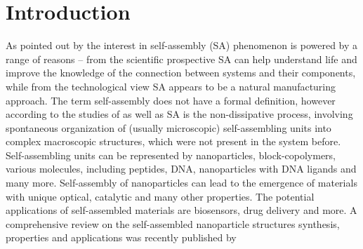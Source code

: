 \section{Introduction}

As pointed out by %
\citet{sadef} the interest in self-assembly (SA) phenomenon is powered by a range of reasons -- from the scientific prospective SA can help understand life and improve the knowledge of the connection between systems and their components, while from the technological view SA appears to be a natural manufacturing approach. The term self-assembly does not have a formal definition,\cite{sadef} however according to the studies of %
\citet{saterm1} as well as %
\citet{saterm2} SA is the non-dissipative process, involving spontaneous organization of  (usually microscopic) self-assembling units  into complex macroscopic structures, which were not present in the system before. 
Self-assembling units can be represented by nanoparticles,\cite{nanopartunit,nanpartun1} block-copolymers,\cite{blockcpunit} various molecules, including peptides,\cite{molecunit} DNA,\cite{dnaunit,dnaunit1} nanoparticles with DNA ligands\cite{mirkin1996dna} and many more. Self-assembly of nanoparticles can lead to the emergence of materials with unique optical,\cite{opticalex} catalytic\cite{catalitprop} and many other properties. The potential applications of self-assembled materials are biosensors,\cite{optappl} drug delivery\cite{drugappl} and more. A comprehensive review on the self-assembled nanoparticle structures  synthesis, properties and applications was recently published by %
\citet{reviewstart}

